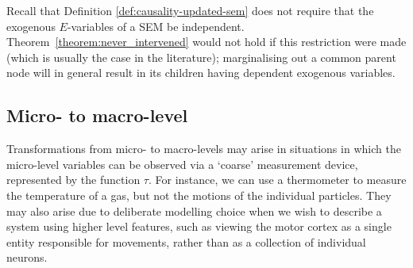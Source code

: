 Recall that Definition \ref{def:causality-updated-sem} does not require that the exogenous $E$-variables of a SEM be independent. 
Theorem~\ref{theorem:never_intervened} would not hold if this restriction were made (which is usually the case in the literature); marginalising out a common parent node will in general result in its children having dependent exogenous variables.

\subsection{Micro- to macro-level}\label{subsection:micromacro}

Transformations from micro- to macro-levels may arise in situations in which the micro-level variables can be observed via a `coarse' measurement device, represented by the function $\tau$.
For instance, we can use a thermometer to measure the temperature of a gas, but not the motions of the individual particles. 
They may also arise due to deliberate modelling choice when we wish to describe a system using higher level features, such as viewing the motor cortex as a single entity responsible for movements, rather than as a collection of individual neurons.


